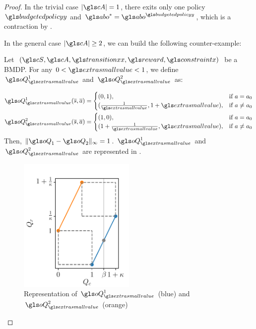 \begin{proof}
    In the trivial case $|\cA| = 1$, there exits only one policy $\budgetedpolicy$ and $\abo^{*}= \abo^{\budgetedpolicy}$, which is a contraction by .

    In the general case $|\cA| \geq 2$, we can build the following counter-example:

    Let $(\cS, \cA, \transition, \reward, \constraint)$ be a \gls{BMDP}.
    For any $0 < \extrasmallvalue < 1$, we define $\oQ_{\extrasmallvalue}^1$ and $\oQ_{\extrasmallvalue}^2$ as:

    \begin{align*}
        \oQ_{\extrasmallvalue}^1(\os,\oa) =
        \begin{cases}
            (0, 1), & \text{if } a = a_0 \\
            (\frac{1}{{\extrasmallvalue}}, 1+{\extrasmallvalue}), & \text{if } a \neq a_0
        \end{cases}\\
        \oQ_{\extrasmallvalue}^2(\os,\oa) =
        \begin{cases}
            (1, 0), & \text{if } a = a_0 \\
            (1+\frac{1}{{\extrasmallvalue}}, {\extrasmallvalue}), & \text{if } a \neq a_0
        \end{cases}
    \end{align*}
    Then, $\|\oQ_1-\oQ_2\|_\infty = 1$.
    $\oQ_{\extrasmallvalue}^1$ and $\oQ_{\extrasmallvalue}^2$ are represented in .

    \begin{figure}[tp]
        \centering
        \includegraphics[width=0.5\textwidth]{sources/appendix/source/img/concavity_example.pdf}
        \caption[Concavity Example]{Representation of $\oQ_{\extrasmallvalue}^1$ (blue) and $\oQ_{\extrasmallvalue}^2$ (orange)}
        \label{fig:concavity_example}
    \end{figure}


\end{proof}
